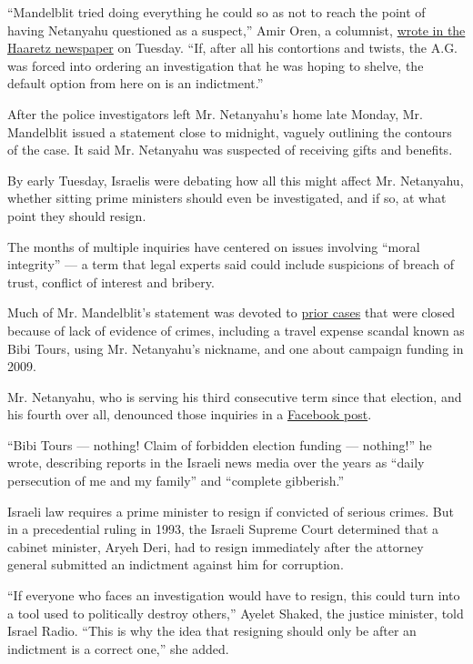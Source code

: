 ``Mandelblit tried doing everything he could so as not to reach the
point of having Netanyahu questioned as a suspect,'' Amir Oren, a
columnist, \href{http://www.haaretz.com/opinion/.premium-1.762624}{wrote
in the Haaretz newspaper} on Tuesday. ``If, after all his contortions
and twists, the A.G. was forced into ordering an investigation that he
was hoping to shelve, the default option from here on is an
indictment.''

After the police investigators left Mr. Netanyahu's home late Monday,
Mr. Mandelblit issued a statement close to midnight, vaguely outlining
the contours of the case. It said Mr. Netanyahu was suspected of
receiving gifts and benefits.

By early Tuesday, Israelis were debating how all this might affect Mr.
Netanyahu, whether sitting prime ministers should even be investigated,
and if so, at what point they should resign.

The months of multiple inquiries have centered on issues involving
``moral integrity'' --- a term that legal experts said could include
suspicions of breach of trust, conflict of interest and bribery.

Much of Mr. Mandelblit's statement was devoted to
\href{https://www.nytimes3xbfgragh.onion/2016/08/01/world/middleeast/israel-netanyahu-scandal-corruption.html?_r=0}{prior
cases} that were closed because of lack of evidence of crimes, including
a travel expense scandal known as Bibi Tours, using Mr. Netanyahu's
nickname, and one about campaign funding in 2009.

Mr. Netanyahu, who is serving his third consecutive term since that
election, and his fourth over all, denounced those inquiries in a
\href{https://www.facebookcorewwwi.onion/Netanyahu/}{Facebook post}.

``Bibi Tours --- nothing! Claim of forbidden election funding ---
nothing!'' he wrote, describing reports in the Israeli news media over
the years as ``daily persecution of me and my family'' and ``complete
gibberish.''

Israeli law requires a prime minister to resign if convicted of serious
crimes. But in a precedential ruling in 1993, the Israeli Supreme Court
determined that a cabinet minister, Aryeh Deri, had to resign
immediately after the attorney general submitted an indictment against
him for corruption.

``If everyone who faces an investigation would have to resign, this
could turn into a tool used to politically destroy others,'' Ayelet
Shaked, the justice minister, told Israel Radio. ``This is why the idea
that resigning should only be after an indictment is a correct one,''
she added.

